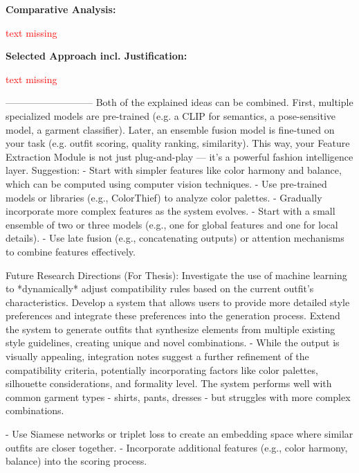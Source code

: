\vspace{0.5cm}

\textbf{Comparative Analysis:}

\vspace{0.5cm}

\textcolor{red}{text missing}

\vspace{0.5cm}

\textbf{Selected Approach incl. Justification:}

\vspace{0.5cm}

\textcolor{red}{text missing}

---------------------------
Both of the explained ideas can be combined. First, multiple specialized models are pre-trained (e.g. a CLIP for semantics, a pose-sensitive model, a garment classifier). Later, an ensemble fusion model is fine-tuned 
on your task (e.g. outfit scoring, quality ranking, similarity).
This way, your Feature Extraction Module is not just plug-and-play — it's a powerful fashion intelligence layer.
Suggestion:
- Start with simpler features like color harmony and balance, which can be computed using computer vision techniques.
- Use pre-trained models or libraries (e.g., ColorThief) to analyze color palettes.
- Gradually incorporate more complex features as the system evolves.
- Start with a small ensemble of two or three models (e.g., one for global features and one for local details).
- Use late fusion (e.g., concatenating outputs) or attention mechanisms to combine features effectively.

Future Research Directions (For Thesis): Investigate the use of machine learning to *dynamically* adjust compatibility rules based on the current outfit's characteristics. Develop a system that allows users to provide more detailed style preferences and integrate these preferences into the generation process. Extend the system to generate outfits that synthesize elements from multiple existing style guidelines, creating unique and novel combinations. - While the output is visually appealing, integration notes suggest a further refinement of the compatibility criteria, potentially incorporating factors like color palettes, silhouette considerations, and formality level.  The system performs well with common garment types - shirts, pants, dresses - but struggles with more complex combinations.

- Use Siamese networks or triplet loss to create an embedding space where similar outfits are closer together.
- Incorporate additional features (e.g., color harmony, balance) into the scoring process.


